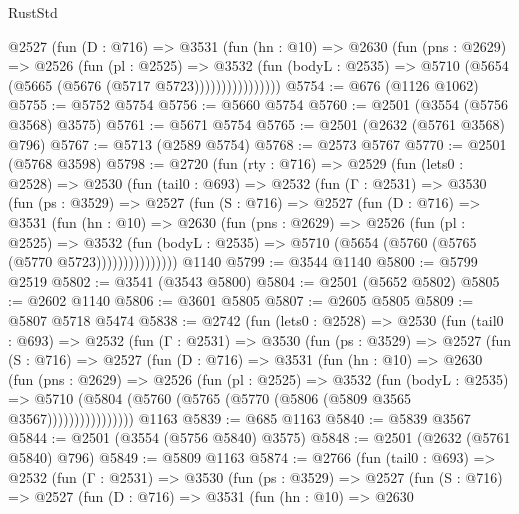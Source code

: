 \begin{lexlean}{RustStd}
\begin{coremodule}
                @2527
                  (fun (D : @716) =>
                  @3531
                    (fun (hn : @10) =>
                    @2630
                      (fun (pns : @2629) =>
                      @2526
                        (fun (pl : @2525) =>
                        @3532
                          (fun (bodyL : @2535) =>
                          @5710 (@5654 (@5665 (@5676 (@5717 @5723))))))))))))))))
@5754 := @676 (@1126 @1062)
@5755 := @5752 @5754
@5756 := @5660 @5754
@5760 := @2501 (@3554 (@5756 @3568) @3575)
@5761 := @5671 @5754
@5765 := @2501 (@2632 (@5761 @3568) @796)
@5767 := @5713 (@2589 @5754)
@5768 := @2573 @5767
@5770 := @2501 (@5768 @3598)
@5798 := @2720
    (fun (rty : @716) =>
    @2529
      (fun (lets0 : @2528) =>
      @2530
        (fun (tail0 : @693) =>
        @2532
          (fun (Γ : @2531) =>
          @3530
            (fun (ps : @3529) =>
            @2527
              (fun (S : @716) =>
              @2527
                (fun (D : @716) =>
                @3531
                  (fun (hn : @10) =>
                  @2630
                    (fun (pns : @2629) =>
                    @2526
                      (fun (pl : @2525) =>
                      @3532
                        (fun (bodyL : @2535) =>
                        @5710 (@5654 (@5760 (@5765 (@5770 @5723)))))))))))))))
    @1140
@5799 := @3544 @1140
@5800 := @5799 @2519
@5802 := @3541 (@3543 @5800)
@5804 := @2501 (@5652 @5802)
@5805 := @2602 @1140
@5806 := @3601 @5805
@5807 := @2605 @5805
@5809 := @5807 @5718 @5474
@5838 := @2742
    (fun (lets0 : @2528) =>
    @2530
      (fun (tail0 : @693) =>
      @2532
        (fun (Γ : @2531) =>
        @3530
          (fun (ps : @3529) =>
          @2527
            (fun (S : @716) =>
            @2527
              (fun (D : @716) =>
              @3531
                (fun (hn : @10) =>
                @2630
                  (fun (pns : @2629) =>
                  @2526
                    (fun (pl : @2525) =>
                    @3532
                      (fun (bodyL : @2535) =>
                      @5710 (@5804 (@5760 (@5765 (@5770 (@5806 (@5809 @3565 @3567))))))))))))))))
    @1163
@5839 := @685 @1163
@5840 := @5839 @3567
@5844 := @2501 (@3554 (@5756 @5840) @3575)
@5848 := @2501 (@2632 (@5761 @5840) @796)
@5849 := @5809 @1163
@5874 := @2766
    (fun (tail0 : @693) =>
    @2532
      (fun (Γ : @2531) =>
      @3530
        (fun (ps : @3529) =>
        @2527
          (fun (S : @716) =>
          @2527
            (fun (D : @716) =>
            @3531
              (fun (hn : @10) =>
              @2630

\end{coremodule}
\end{lexlean}
